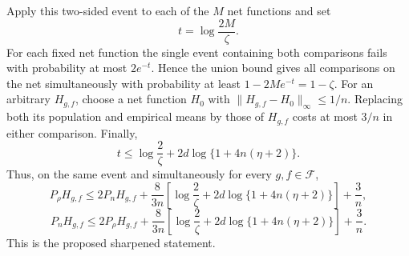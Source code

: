 Apply this two-sided event to each of the \(M\) net functions and set
\[
t=\log\frac{2M}{\zeta}.
\]
For each fixed net function the single event containing both comparisons fails with probability at most \(2e^{-t}\). Hence the union bound gives all comparisons on the net simultaneously with probability at least \(1-2Me^{-t}=1-\zeta\). For an arbitrary \(H_{g,f}\), choose a net function \(H_0\) with \(\lVert H_{g,f}-H_0\rVert_\infty\le1/n\). Replacing both its population and empirical means by those of \(H_{g,f}\) costs at most \(3/n\) in either comparison. Finally,
\[
t\le\log\frac2\zeta+2d\log\{1+4n(\eta+2)\}.
\]
Thus, on the same event and simultaneously for every \(g,f\in\mathcal F\),
\[
P_\rho H_{g,f}\le2P_nH_{g,f}+\frac{8}{3n}\left[\log\frac2\zeta+2d\log\{1+4n(\eta+2)\}\right]+\frac3n,
\]
\[
P_nH_{g,f}\le2P_\rho H_{g,f}+\frac{8}{3n}\left[\log\frac2\zeta+2d\log\{1+4n(\eta+2)\}\right]+\frac3n.
\]
This is the proposed sharpened statement.